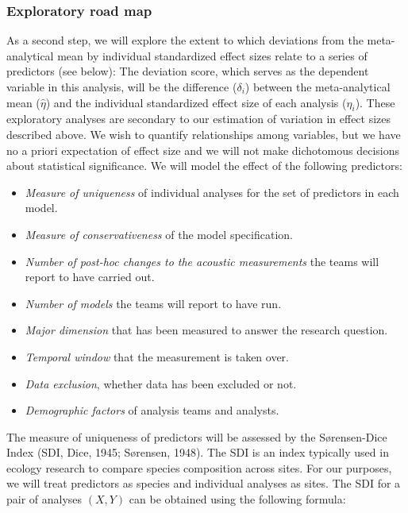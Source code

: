 \documentclass[
  english,
  man,floatsintext]{apa6}
\providecommand{\tightlist}{%
  \setlength{\itemsep}{0pt}\setlength{\parskip}{0pt}}
\begin{document}
\hypertarget{exploratory-road-map}{%
\subsubsection{Exploratory road map}\label{exploratory-road-map}}

As a second step, we will explore the extent to which deviations from the meta-analytical mean by individual standardized effect sizes relate to a series of predictors (see below): The deviation score, which serves as the dependent variable in this analysis, will be the difference (\(\delta_i\)) between the meta-analytical mean (\(\hat{\eta}\)) and the individual standardized effect size of each analysis (\(\eta_i\)).
These exploratory analyses are secondary to our estimation of variation in effect sizes described above.
We wish to quantify relationships among variables, but we have no a priori expectation of effect size and we will not make dichotomous decisions about statistical significance.
We will model the effect of the following predictors:

\begin{itemize}
\tightlist
\item
  \emph{Measure of uniqueness} of individual analyses for the set of predictors in each model.
\item
  \emph{Measure of conservativeness} of the model specification.
\item
  \emph{Number of post-hoc changes to the acoustic measurements} the teams will report to have carried out.
\item
  \emph{Number of models} the teams will report to have run.
\item
  \emph{Major dimension} that has been measured to answer the research question.
\item
  \emph{Temporal window} that the measurement is taken over.
\item
  \emph{Data exclusion}, whether data has been excluded or not.
\item
  \emph{Demographic factors} of analysis teams and analysts.
\end{itemize}

The measure of uniqueness of predictors will be assessed by the Sørensen-Dice Index (SDI, Dice, 1945; Sørensen, 1948).
The SDI is an index typically used in ecology research to compare species composition across sites.
For our purposes, we will treat predictors as species and individual analyses as sites.
The SDI for a pair of analyses \((X, Y)\) can be obtained using the following formula:
\end{document}
